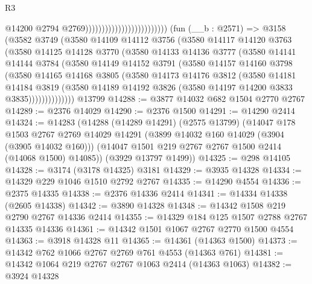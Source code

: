 \begin{lexlean}{R3}
\begin{coremodule}
                                                      @14200
                                                      @2794
                                                      @2769)))))))))))))))))))))))))
    (fun (__b : @2571) =>
    @3158
      (@3582
        @3749
        (@3580
          @14109
          @14112
          @3756
          (@3580
            @14117
            @14120
            @3763
            (@3580
              @14125
              @14128
              @3770
              (@3580
                @14133
                @14136
                @3777
                (@3580
                  @14141
                  @14144
                  @3784
                  (@3580
                    @14149
                    @14152
                    @3791
                    (@3580
                      @14157
                      @14160
                      @3798
                      (@3580
                        @14165
                        @14168
                        @3805
                        (@3580
                          @14173
                          @14176
                          @3812
                          (@3580
                            @14181
                            @14184
                            @3819
                            (@3580
                              @14189
                              @14192
                              @3826
                              (@3580 @14197 @14200 @3833 @3835))))))))))))))
    @13799
@14288 := @3877 @14032 @682 @1504 @2770 @2767
@14289 := @2376 @14029
@14290 := @2376 @1500
@14291 := @14290 @2414
@14324 := @14283
    (@14288
      (@14289 @14291)
      (@2575 @13799)
      (@14047
        @178
        @1503
        @2767
        @2769
        @14029
        @14291
        (@3899 @14032 @160 @14029 (@3904 (@3905 @14032 @160)))
        (@14047 @1501 @219 @2767 @2767 @1500 @2414 (@14068 @1500) @14085))
      (@3929 @13797 @1499))
@14325 := @298 @14105
@14328 := @3174 (@3178 @14325) @3181
@14329 := @3935 @14328
@14334 := @14329 @229 @1046 @1510 @2792 @2767
@14335 := @14290 @4554
@14336 := @2375 @14335
@14338 := @2376 @14336 @2414
@14341 := @14334 @14338 (@2605 @14338)
@14342 := @3890 @14328
@14348 := @14342 @1508 @219 @2790 @2767 @14336 @2414
@14355 := @14329 @184 @125 @1507 @2788 @2767 @14335 @14336
@14361 := @14342 @1501 @1067 @2767 @2770 @1500 @4554
@14363 := @3918 @14328 @11
@14365 := @14361 (@14363 @1500)
@14373 := @14342 @762 @1066 @2767 @2769 @761 @4553 (@14363 @761)
@14381 := @14342 @1064 @219 @2767 @2767 @1063 @2414 (@14363 @1063)
@14382 := @3924 @14328

\end{coremodule}
\end{lexlean}

